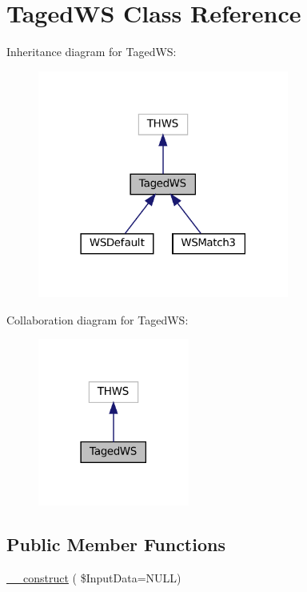 \hypertarget{class_taged_w_s}{}\section{Taged\+WS Class Reference}
\label{class_taged_w_s}


Inheritance diagram for Taged\+WS\+:\nopagebreak
\begin{figure}[H]
\begin{center}
\leavevmode
\includegraphics[width=234pt]{class_taged_w_s__inherit__graph}
\end{center}
\end{figure}


Collaboration diagram for Taged\+WS\+:\nopagebreak
\begin{figure}[H]
\begin{center}
\leavevmode
\includegraphics[width=141pt]{class_taged_w_s__coll__graph}
\end{center}
\end{figure}
\subsection*{Public Member Functions}
\begin{DoxyCompactItemize}
\item 
\hyperlink{class_taged_w_s_a4d93934deb289278e270c852f6c963dc}{\+\_\+\+\_\+construct} ( \$Input\+Data=N\+U\+LL)
\end{DoxyCompactItemize}
